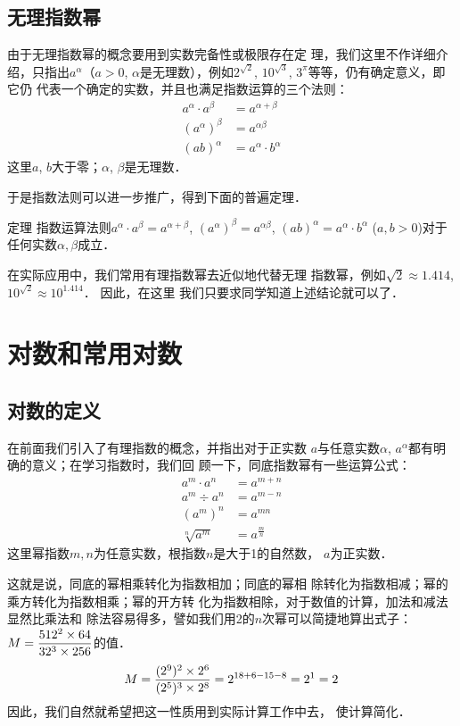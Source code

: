 \subsection{无理指数幂}
由于无理指数幂的概念要用到实数完备性或极限存在定
理，我们这里不作详细介绍，只指出$a^{\alpha}$（$a>0$, $\alpha$是无理数），例如$2^{\sqrt{2}}$, $10^{\sqrt{3}}$, $3^{\pi}$等等，仍有确定意义，即它仍
代表一个确定的实数，并且也满足指数运算的三个法则：
\[\begin{split}
    a^{\alpha}\cdot a^{\beta}&=a^{\alpha+\beta}\\
    \left(a^{\alpha}\right)^{\beta}&=a^{\alpha\beta}\\
    (ab)^{\alpha}&=a^{\alpha}\cdot b^{\alpha}
\end{split}\]
这里$a$, $b$大于零；$\alpha$, $\beta$是无理数．

于是指数法则可以进一步推广，得到下面的普遍定理．

\begin{blk}{定理}
    指数运算法则$a^{\alpha}\cdot a^{\beta}=a^{\alpha+\beta}$, $\left(a^{\alpha}\right)^{\beta}=a^{\alpha\beta}$, $(ab)^{\alpha}=a^{\alpha}\cdot b^{\alpha}$ ($a,b>0$)对于任何实数$\alpha, \beta$成立．
\end{blk}

在实际应用中，我们常用有理指数幂去近似地代替无理
指数幂，例如$\sqrt{2}\approx 1.414$, $10^{\sqrt{2}}\approx 10^{1.414}$．
因此，在这里
我们只要求同学知道上述结论就可以了．

\section{对数和常用对数}
\subsection{对数的定义}

在前面我们引入了有理指数的概念，并指出对于正实数
$a$与任意实数$\alpha$, $a^{\alpha}$都有明确的意义；在学习指数时，我们回
顾一下，同底指数幂有一些运算公式：
\[\begin{split}
    a^{m}\cdot a^n&=a^{m+n}\\
    a^{m}\div a^n&=a^{m-n}\\
    (a^m)^n&=a^{mn}\\
    \sqrt[n]{a^m}&=a^{\tfrac{m}{n}}
\end{split}\]
这里幂指数$m,n$为任意实数，根指数$n$是大于1的自然数，
$a$为正实数．

这就是说，同底的幂相乘转化为指数相加；同底的幂相
除转化为指数相减；幂的乘方转化为指数相乘；幂的开方转
化为指数相除，对于数值的计算，加法和减法显然比乘法和
除法容易得多，譬如我们用2的$n$次幂可以简捷地算出式子：
$M=\dfrac{512^2\times 64}{32^3\times 256}$的值．
\[M=\dfrac{(2^9)^2\times 2^6}{(2^5)^3\times 2^8}=2^{18+6-15-8}=2^1=2\]
因此，我们自然就希望把这一性质用到实际计算工作中去，
使计算简化．

